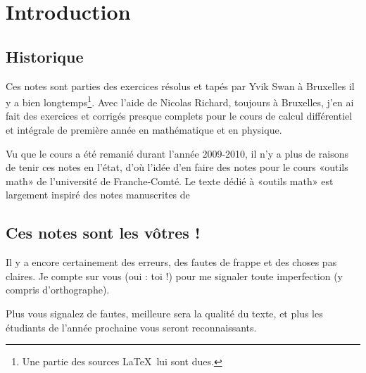 
\chapter*{Introduction}

\section*{Historique}

Ces notes sont parties des exercices résolus et tapés par Yvik Swan à Bruxelles il y a bien longtemps\footnote{Une partie des sources \LaTeX\ lui sont dues.}. Avec l'aide de Nicolas Richard, toujours à Bruxelles, j'en ai fait des exercices et corrigés presque complets pour le cours de calcul différentiel et intégrale de première année en mathématique et en physique.

Vu que le cours a été remanié durant l'année 2009-2010, il n'y a plus de raisons de tenir ces notes en l'état, d'où l'idée d'en faire des notes pour le cours «outils math» de l'université de Franche-Comté. Le texte dédié à «outils math» est largement inspiré des notes manuscrites de 


					\section*{Ces notes sont les vôtres !}


Il y a encore certainement des erreurs, des fautes de frappe et des choses pas claires. Je compte sur vous (oui : toi !) pour me signaler toute imperfection (y compris d'orthographe).

Plus vous signalez de fautes, meilleure sera la qualité du texte, et plus les étudiants de l'année prochaine vous seront reconnaissants.

